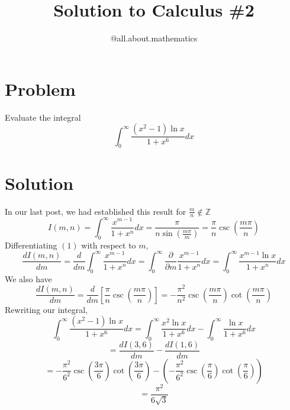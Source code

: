 \documentclass[10pt]{article}
\title{\Huge{Solution to Calculus \#2}}
\author{@all.about.mathematics}
\date{}
\begin{document}
\Large
\maketitle
\pagecolor{black}
\section{Problem}
Evaluate the integral 
\large
$$\int_{0}^{\infty}\frac{(x^2-1)\ln x}{1+x^6}dx$$
\large
\newpage
\section{Solution}
In our last post, we had established this result for $\frac m n \not \in \mathbb{Z}$
\begin{equation}
I(m,n)=\int_{0}^{\infty}\frac{x^{m-1}}{1+x^n}dx=\frac{\pi}{n\sin\left(\frac{m\pi}{m}\right)}=\frac{\pi}{n}\csc\left(\frac{m\pi}{n}\right)
\end{equation}
Differentiating $(1)$ with respect to $m$,
$$\frac{dI(m,n)}{dm}=\frac{d}{dm}\int_{0}^{\infty}\frac{x^{m-1}}{1+x^n}dx= \int_{0}^{\infty}\frac{\partial}{\partial m}\frac{x^{m-1}}{1+x^n}dx= \int_{0}^{\infty}\frac{x^{m-1} \ln x}{1+x^n}dx$$
We also have 
$$\frac{dI(m,n)}{dm}=\frac{d}{dm}\left[\frac{\pi}{n}\csc\left(\frac{m\pi}{n}\right)\right]=-\frac{\pi^2}{n^2}\csc\left(\frac{m\pi}{n}\right)\cot\left(\frac{m\pi}{n}\right)$$
Rewriting our integral,
$$\int_{0}^{\infty}\frac{(x^2-1)\ln x}{1+x^6}dx=\int_{0}^{\infty}\frac{x^2\ln x}{1+x^6}dx-\int_{0}^{\infty}\frac{\ln x}{1+x^6}dx$$
$$=\frac{dI(3,6)}{dm}-\frac{dI(1,6)}{dm}$$
$$=-\frac{\pi^2}{6^2}\csc\left(\frac{3\pi}{6}\right)\cot\left(\frac{3\pi}{6}\right)-\left(-\frac{\pi^2}{6^2}\csc\left(\frac{\pi}{6}\right)\cot\left(\frac{\pi}{6}\right)\right)$$
$$=\frac{\pi^2}{6\sqrt{3}}$$
\end{document}
